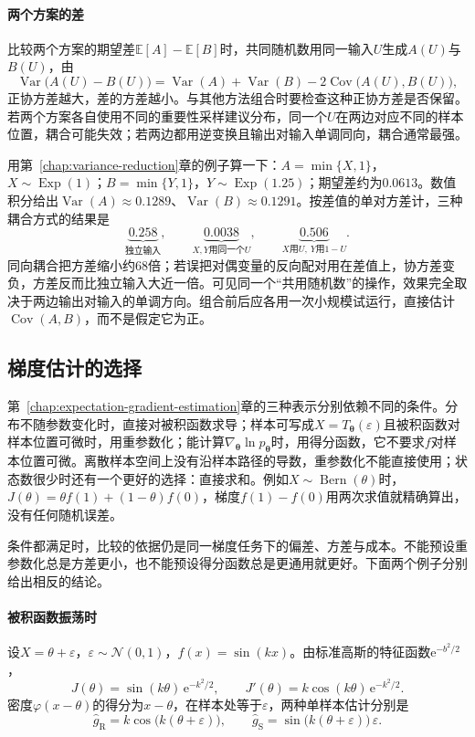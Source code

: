 \paragraph{两个方案的差}
比较两个方案的期望差$\mathbb{E}[A]-\mathbb{E}[B]$时，共同随机数用同一输入$U$生成$A(U)$与$B(U)$，由
\[
  \operatorname{Var}\bigl(A(U)-B(U)\bigr)=\operatorname{Var}(A)+\operatorname{Var}(B)-2\operatorname{Cov}\bigl(A(U),B(U)\bigr),
\]
正协方差越大，差的方差越小。与其他方法组合时要检查这种正协方差是否保留。若两个方案各自使用不同的重要性采样建议分布，同一个$U$在两边对应不同的样本位置，耦合可能失效；若两边都用逆变换且输出对输入单调同向，耦合通常最强。

用第~\ref{chap:variance-reduction}章的例子算一下：$A=\min\{X,1\}$，$X\sim\operatorname{Exp}(1)$；$B=\min\{Y,1\}$，$Y\sim\operatorname{Exp}(1.25)$；期望差约为$0.0613$。数值积分给出$\operatorname{Var}(A)\approx0.1289$、$\operatorname{Var}(B)\approx0.1291$。按差值的单对方差计，三种耦合方式的结果是
\[
  \underbrace{0.258}_{\text{独立输入}},\qquad\underbrace{0.0038}_{X,Y\text{用同一个}U},\qquad\underbrace{0.506}_{X\text{用}U,\ Y\text{用}1-U} .
\]
同向耦合把方差缩小约$68$倍；若误把对偶变量的反向配对用在差值上，协方差变负，方差反而比独立输入大近一倍。可见同一个“共用随机数”的操作，效果完全取决于两边输出对输入的单调方向。组合前后应各用一次小规模试运行，直接估计$\operatorname{Cov}(A,B)$，而不是假定它为正。

\subsection{梯度估计的选择}
\label{sec:budget-gradient-choice}

第~\ref{chap:expectation-gradient-estimation}章的三种表示分别依赖不同的条件。分布不随参数变化时，直接对被积函数求导；样本可写成$X=T_{\bm{\theta}}(\varepsilon)$且被积函数对样本位置可微时，用重参数化；能计算$\nabla_{\bm{\theta}}\ln p_{\bm{\theta}}$时，用得分函数，它不要求$f$对样本位置可微。离散样本空间上没有沿样本路径的导数，重参数化不能直接使用；状态数很少时还有一个更好的选择：直接求和。例如$X\sim\operatorname{Bern}(\theta)$时，$J(\theta)=\theta f(1)+(1-\theta)f(0)$，梯度$f(1)-f(0)$用两次求值就精确算出，没有任何随机误差。

条件都满足时，比较的依据仍是同一梯度任务下的偏差、方差与成本。不能预设重参数化总是方差更小，也不能预设得分函数总是更通用就更好。下面两个例子分别给出相反的结论。

\paragraph{被积函数振荡时}
设$X=\theta+\varepsilon$，$\varepsilon\sim\mathcal{N}(0,1)$，$f(x)=\sin(kx)$。由标准高斯的特征函数$\mathrm{e}^{-b^{2}/2}$，
\[
  J(\theta)=\sin(k\theta)\,\mathrm{e}^{-k^{2}/2},\qquad J'(\theta)=k\cos(k\theta)\,\mathrm{e}^{-k^{2}/2}.
\]
密度$\varphi(x-\theta)$的得分为$x-\theta$，在样本处等于$\varepsilon$，两种单样本估计分别是
\[
  \hat{g}_{\mathrm{R}}=k\cos\bigl(k(\theta+\varepsilon)\bigr),\qquad\hat{g}_{\mathrm{S}}=\sin\bigl(k(\theta+\varepsilon)\bigr)\,\varepsilon .
\]

